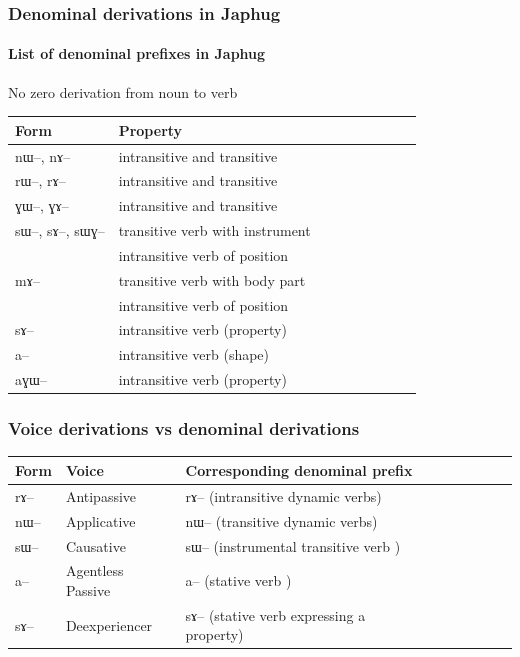 \documentclass[xcolor=table]{beamer}
\newcommand{\ipa}[1]{{\phon \mbox{#1}}} %
\begin{document}
  \begin{frame} 
 \frametitle{Denominal derivations in Japhug} 
  \framesubtitle{List of denominal prefixes in Japhug} 
 
No zero derivation from noun to verb 
 
\begin{tabular}{lllllllll} \toprule
Form& Property \\
\midrule
\ipa{nɯ}--, \ipa{nɤ}-- & intransitive and transitive \\
\ipa{rɯ}--, \ipa{rɤ}-- & intransitive and transitive \\
\ipa{ɣɯ}--, \ipa{ɣɤ}-- & intransitive and transitive \\
\ipa{sɯ}--, \ipa{sɤ}--, \ipa{sɯɣ}--  & transitive verb with instrument\\
&intransitive verb of position \\
\ipa{mɤ}-- & transitive verb with body part\\
& intransitive verb of position \\
\ipa{sɤ}-- & intransitive verb (property) \\
\ipa{a}-- & intransitive verb (shape) \\
\ipa{aɣɯ}-- & intransitive verb (property) \\
    \bottomrule
\end{tabular}

\end{frame}   

  \begin{frame} 
 \frametitle{Voice derivations vs denominal derivations} 
 
\begin{tabular}{lllllllll} \toprule
Form& Voice & Corresponding denominal prefix \\
\midrule
\ipa{rɤ}-- & Antipassive &    \ipa{rɤ}-- (intransitive dynamic verbs)\\
\ipa{nɯ}-- & Applicative &    \ipa{nɯ}-- (transitive dynamic verbs)\\
\ipa{sɯ}-- & Causative &    \ipa{sɯ}-- (instrumental transitive verb )\\
\ipa{a}-- & Agentless Passive &    \ipa{a}-- (stative verb )\\
\ipa{sɤ}--  & Deexperiencer &    \ipa{sɤ}-- (stative verb expressing a property)\\
    \bottomrule
\end{tabular}

\end{frame}   
\end{document}
